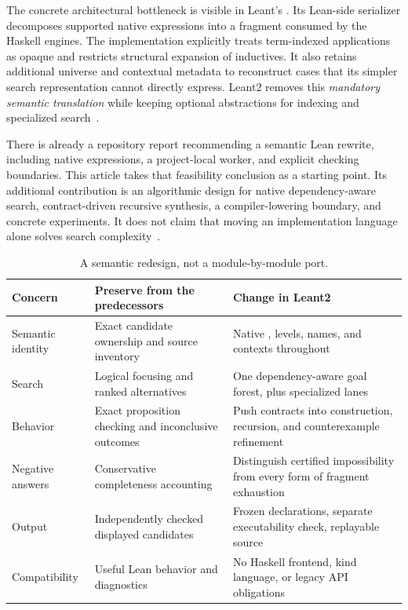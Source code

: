 The concrete architectural bottleneck is visible in Leant's . Its Lean-side serializer decomposes supported native expressions into a fragment consumed by the Haskell engines. The implementation explicitly treats term-indexed applications as opaque and restricts structural expansion of inductives. It also retains additional universe and contextual metadata to reconstruct cases that its simpler search representation cannot directly express. Leant2 removes this \emph{mandatory semantic translation} while keeping optional abstractions for indexing and specialized search~\cite{fragment}.

There is already a repository report recommending a semantic Lean rewrite, including native expressions, a project-local worker, and explicit checking boundaries. This article takes that feasibility conclusion as a starting point. Its additional contribution is an algorithmic design for native dependency-aware search, contract-driven recursive synthesis, a compiler-lowering boundary, and concrete experiments. It does not claim that moving an implementation language alone solves search complexity~\cite{rewrite}.

\begin{table}[ht]
\centering\small
\begin{tabularx}{\textwidth}{@{}L{0.24\textwidth}YY@{}}
\toprule
Concern & Preserve from the predecessors & Change in Leant2 \\
\midrule
Semantic identity & Exact candidate ownership and source inventory & Native , levels, names, and contexts throughout \\
Search & Logical focusing and ranked alternatives & One dependency-aware goal forest, plus specialized lanes \\
Behavior & Exact proposition checking and inconclusive outcomes & Push contracts into construction, recursion, and counterexample refinement \\
Negative answers & Conservative completeness accounting & Distinguish certified impossibility from every form of fragment exhaustion \\
Output & Independently checked displayed candidates & Frozen declarations, separate executability check, replayable source \\
Compatibility & Useful Lean behavior and diagnostics & No Haskell frontend, kind language, or legacy API obligations \\
\bottomrule
\end{tabularx}
\caption{A semantic redesign, not a module-by-module port.}
\end{table}

